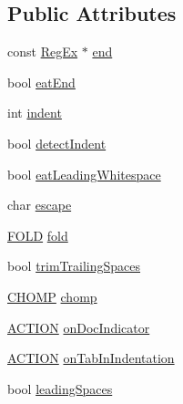 \subsection*{Public Attributes}
\begin{DoxyCompactItemize}
\item 
const \mbox{\hyperlink{class_y_a_m_l_1_1_reg_ex}{Reg\+Ex}} $\ast$ \mbox{\hyperlink{struct_y_a_m_l_1_1_scan_scalar_params_a5d2356c55f632fadf69b26a15580f02f}{end}}
\item 
bool \mbox{\hyperlink{struct_y_a_m_l_1_1_scan_scalar_params_a792aec4ff6d8e3552bfb9f6a7003d877}{eat\+End}}
\item 
int \mbox{\hyperlink{struct_y_a_m_l_1_1_scan_scalar_params_a3167ea3f80a79b765ade4de111c1ed2b}{indent}}
\item 
bool \mbox{\hyperlink{struct_y_a_m_l_1_1_scan_scalar_params_a601811289f94ffbb9a625a09218ad5d6}{detect\+Indent}}
\item 
bool \mbox{\hyperlink{struct_y_a_m_l_1_1_scan_scalar_params_acc6f018805bcd7698f346b1201274c32}{eat\+Leading\+Whitespace}}
\item 
char \mbox{\hyperlink{struct_y_a_m_l_1_1_scan_scalar_params_aebdfc73fd5936c75cb19c7d7116857ac}{escape}}
\item 
\mbox{\hyperlink{namespace_y_a_m_l_a3660a77a9a6a5d6e4286899fb2ea5745}{F\+O\+LD}} \mbox{\hyperlink{struct_y_a_m_l_1_1_scan_scalar_params_a708a9b04a78a52165a89f42559554dba}{fold}}
\item 
bool \mbox{\hyperlink{struct_y_a_m_l_1_1_scan_scalar_params_ad48fca62e46d2f1cefa11cb7f4490939}{trim\+Trailing\+Spaces}}
\item 
\mbox{\hyperlink{namespace_y_a_m_l_ac13b04be586f671c9575454e6db6e843}{C\+H\+O\+MP}} \mbox{\hyperlink{struct_y_a_m_l_1_1_scan_scalar_params_adc66f6393010976d6e2848ffd22844b6}{chomp}}
\item 
\mbox{\hyperlink{namespace_y_a_m_l_afebe2c8ae8d2681a7fe8a4a74793758b}{A\+C\+T\+I\+ON}} \mbox{\hyperlink{struct_y_a_m_l_1_1_scan_scalar_params_abdd28911284a2e3bdd3192f2f631b1a5}{on\+Doc\+Indicator}}
\item 
\mbox{\hyperlink{namespace_y_a_m_l_afebe2c8ae8d2681a7fe8a4a74793758b}{A\+C\+T\+I\+ON}} \mbox{\hyperlink{struct_y_a_m_l_1_1_scan_scalar_params_a48efaf7868fbd6661cf3490705b9e91b}{on\+Tab\+In\+Indentation}}
\item 
bool \mbox{\hyperlink{struct_y_a_m_l_1_1_scan_scalar_params_a7961b5d274ce8d94e49b63c68f03cebc}{leading\+Spaces}}
\end{DoxyCompactItemize}



